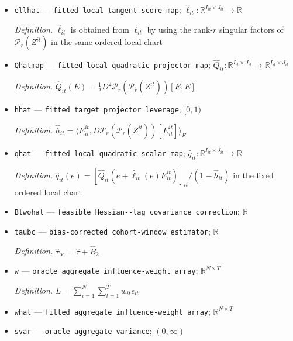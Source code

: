 \documentclass{article}
\begin{document}
\begin{itemize}
  \par\smallskip\noindent\emph{Definition.} \(\Delta_\gamma=\max_{|h|\le q}|\widehat\gamma(h)-\gamma(h)|\)
  \item \texttt{ellhat} --- \texttt{fitted local tangent-\allowbreak{}score map}; \(\widehat\ell_{it}:\mathbb R^{I_{it}\times J_{it}}\to\mathbb R\)
  \par\smallskip\noindent\emph{Definition.} \(\widehat\ell_{it}\) is obtained from \(\ell_{it}\) by using the rank-\(r\) singular factors of \(\mathcal P_r(Z^{it})\) in the same ordered local chart
  \item \texttt{Qhatmap} --- \texttt{fitted local quadratic projector map}; \(\widehat Q_{it}:\mathbb R^{I_{it}\times J_{it}}\to\mathbb R^{I_{it}\times J_{it}}\)
  \par\smallskip\noindent\emph{Definition.} \(\widehat Q_{it}(E)=\tfrac12D^2\mathcal P_r(\mathcal P_r(Z^{it}))[E,E]\)
  \item \texttt{hhat} --- \texttt{fitted target projector leverage}; \([0,1)\)
  \par\smallskip\noindent\emph{Definition.} \(\widehat h_{it}=\langle E^{it}_{it},D\mathcal P_r(\mathcal P_r(Z^{it}))[E^{it}_{it}]\rangle_F\)
  \item \texttt{qhat} --- \texttt{fitted local quadratic scalar map}; \(\widehat q_{it}:\mathbb R^{I_{it}\times J_{it}}\to\mathbb R\)
  \par\smallskip\noindent\emph{Definition.} \(\widehat q_{it}(e)=[\widehat Q_{it}(e+\widehat\ell_{it}(e)E^{it}_{it})]_{it}/(1-\widehat h_{it})\) in the fixed ordered local chart
  \item \texttt{Btwohat} --- \texttt{feasible Hessian-\allowbreak{}-\allowbreak{}lag covariance correction}; \(\mathbb R\)
  \item \texttt{taubc} --- \texttt{bias-\allowbreak{}corrected cohort-\allowbreak{}window estimator}; \(\mathbb R\)
  \par\smallskip\noindent\emph{Definition.} \(\widehat\tau_{\mathrm{bc}}=\widehat\tau+\widehat B_2\)
  \item \texttt{w} --- \texttt{oracle aggregate influence-\allowbreak{}weight array}; \(\mathbb R^{N\times T}\)
  \par\smallskip\noindent\emph{Definition.} \(L=\sum_{i=1}^N\sum_{t=1}^T w_{it}\epsilon_{it}\)
  \item \texttt{what} --- \texttt{fitted aggregate influence-\allowbreak{}weight array}; \(\mathbb R^{N\times T}\)
  \item \texttt{svar} --- \texttt{oracle aggregate variance}; \((0,\infty)\)

\end{itemize}
\end{document}
